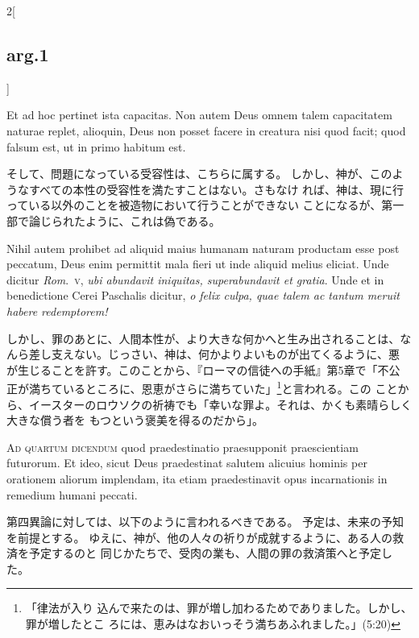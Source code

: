 \documentclass[paper=a4paper,fontsize=10pt,jafontsize=9pt,titlepage]{jlreq}
\begin{document}
\begin{paracol}{2}[\subsection{arg.1}]
\switchcolumn*

Et ad hoc pertinet ista
capacitas. Non autem Deus omnem talem capacitatem naturae replet,
alioquin, Deus non posset facere in creatura nisi quod facit; quod
falsum est, ut in primo habitum est.

\switchcolumn

そして、問題になっている受容性は、こちらに属する。
しかし、神が、このようなすべての本性の受容性を満たすことはない。さもなけ
 れば、神は、現に行っている以外のことを被造物において行うことができない
 ことになるが、第一部で論じられたように、これは偽である。

\switchcolumn*

Nihil autem prohibet ad aliquid
maius humanam naturam productam esse post peccatum, Deus enim permittit
mala fieri ut inde aliquid melius eliciat. Unde dicitur {\itshape Rom}.~{\scshape v}, {\itshape ubi
abundavit iniquitas, superabundavit et gratia}. Unde et in benedictione
Cerei Paschalis dicitur, {\itshape o felix culpa, quae talem ac tantum meruit
habere redemptorem!}

\switchcolumn

しかし、罪のあとに、人間本性が、より大きな何かへと生み出されることは、な
 んら差し支えない。じっさい、神は、何かよりよいものが出てくるように、悪
 が生じることを許す。このことから、『ローマの信徒への手紙』第5章で「不公
 正が満ちているところに、恩恵がさらに満ちていた」\footnote{「律法が入り
 込んで来たのは、罪が増し加わるためでありました。しかし、罪が増したとこ
 ろには、恵みはなおいっそう満ちあふれました。」(5:20) }と言われる。この
 ことから、イースターのロウソクの祈祷でも「幸いな罪よ。それは、かくも素晴らしく大きな償う者を
 もつという褒美を得るのだから」。

\switchcolumn*[\subsection{ad.4}]

{\scshape Ad quartum dicendum} quod praedestinatio
praesupponit praescientiam futurorum. Et ideo, sicut Deus praedestinat
salutem alicuius hominis per orationem aliorum implendam, ita etiam
praedestinavit opus incarnationis in remedium humani peccati.

\switchcolumn

第四異論に対しては、以下のように言われるべきである。
予定は、未来の予知を前提とする。
ゆえに、神が、他の人々の祈りが成就するように、ある人の救済を予定するのと
 同じかたちで、受肉の業も、人間の罪の救済策へと予定した。


\end{paracol}
\end{document}
